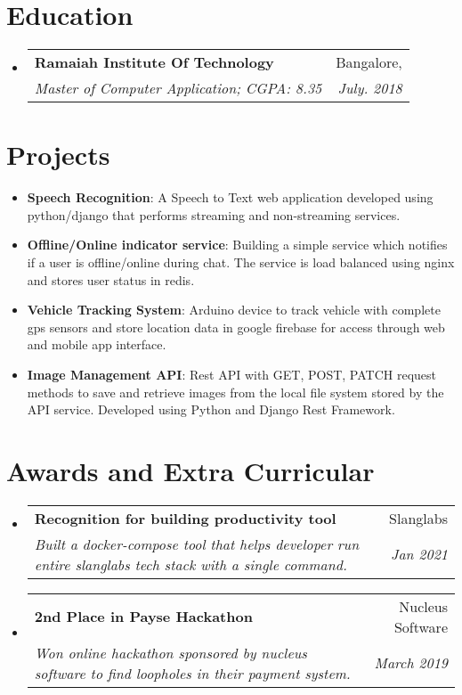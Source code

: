 \documentclass[letterpaper,11pt]{article}
\makeatletter
\newcommand{\resumeItem}[2]{
  \item\small{
    \textbf{#1}{: #2 \vspace{-2pt}}
  }
}
\newcommand{\resumeSubheading}[4]{
  \vspace{-1pt}\item
    \begin{tabular*}{0.97\textwidth}{l@{\extracolsep{\fill}}r}
      \textbf{#1} & #2 \\
      \textit{\small#3} & \textit{\small #4} \\
    \end{tabular*}\vspace{-5pt}
}
\newcommand{\resumeSubItem}[2]{\resumeItem{#1}{#2}\vspace{-4pt}}
\newcommand{\resumeSubHeadingListStart}{\begin{itemize}[leftmargin=*]}
\newcommand{\resumeSubHeadingListEnd}{\end{itemize}}
\makeatother
\begin{document}
 
\section{Education}
  \resumeSubHeadingListStart
    \resumeSubheading
        {Ramaiah Institute Of Technology}{Bangalore,}
        {Master of Computer Application;  CGPA: 8.35}{July. 2018}
  \resumeSubHeadingListEnd


\section{Projects}
  \resumeSubHeadingListStart
      \resumeSubItem{Speech Recognition}
      {A Speech to Text web application developed using python/django that  performs streaming and non-streaming services.}
    \resumeSubItem{Offline/Online indicator service}
      {Building a simple service which notifies if a user is offline/online during chat. The service is load balanced using nginx and stores user status in redis.}
    \resumeSubItem{Vehicle Tracking System}
      {Arduino device to track vehicle with complete gps sensors and store location data in google firebase for access through web and mobile app interface.}
    \resumeSubItem{Image Management API}
      {Rest API with GET, POST, PATCH request methods to save and retrieve images from the local file system stored by the API service. Developed using Python and Django Rest Framework.}
  \resumeSubHeadingListEnd


\section{Awards and Extra Curricular}
  \resumeSubHeadingListStart
    \resumeSubheading
        {Recognition for building productivity tool}{Slanglabs}
        {Built a docker-compose tool that helps developer run entire slanglabs tech stack with a single command.}{Jan 2021}
    \resumeSubheading
        {2nd Place in Payse Hackathon}{Nucleus Software}
        {Won online hackathon sponsored by nucleus software to find loopholes in their payment system.}{March 2019}
  \resumeSubHeadingListEnd
\end{document}
